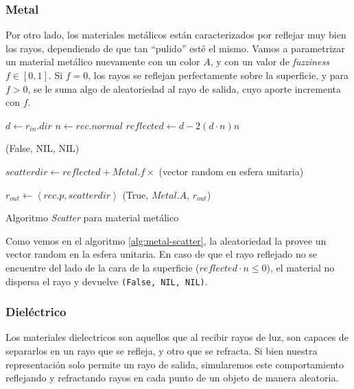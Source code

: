 \subsubsection{Metal}

Por otro lado, los materiales metálicos están caracterizados por reflejar muy
bien los rayos, dependiendo de que tan ``pulido'' esté el mismo. Vamos a
parametrizar un material metálico nuevamente con un color $A$, y con un valor de
\textit{fuzziness} $f \in [0, 1]$. Si $f=0$, los rayos se reflejan perfectamente
sobre la superficie, y para $f>0$, se le suma algo de aleatoriedad al rayo de
salida, cuyo aporte incrementa con $f$.

\begin{algorithm}
\begin{algorithmic}[1]

    \State $d \gets r_{in}.dir$
    \State $n \gets rec.normal$
    \State $reflected \gets d - 2 (d \cdot n) n $

        \State \Return (False, NIL, NIL)
    \EndIf

    \State $scatterdir \gets reflected + Metal.f \times$ (vector random en esfera
    unitaria)

    \State $r_{out} \gets \left \langle rec.p, scatterdir \right \rangle$
    \State \Return (True, $Metal.A$, $r_{out}$)
\EndFunction
\end{algorithmic}
\caption{Algoritmo \textit{Scatter} para material metálico}
\label{alg:metal-scatter}
\end{algorithm}

Como vemos en el algoritmo \ref{alg:metal-scatter}, la aleatoriedad la provee un
vector random en la esfera unitaria. En caso de que el rayo reflejado no se
encuentre del lado de la cara de la superficie ($reflected \cdot n \le 0$), el
material no dispersa el rayo y devuelve \texttt{(False, NIL, NIL)}.

\subsubsection{Dieléctrico}

Los materiales dielectricos son aquellos que al recibir rayos de luz, son
capaces de separarlos en un rayo que se refleja, y otro que se refracta. Si bien
nuestra representación solo permite un rayo de salida, simularemos este
comportamiento reflejando y refractando rayos en cada punto de un objeto de
manera aleatoria.

